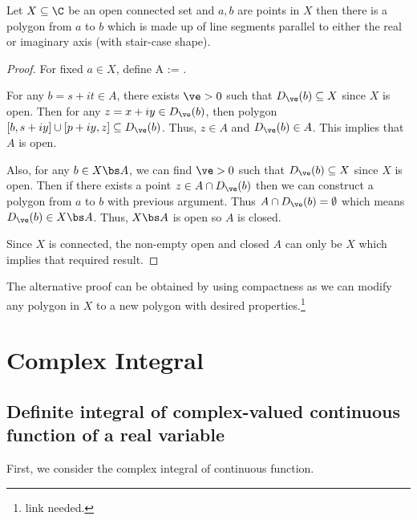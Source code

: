 \begin{corollary}
Let $X\subseteq \C$ be an open connected set and $a,b$ are points in $X$ then there is a polygon from $a$ to $b$ which is made up of line segments parallel to either the real or imaginary axis (with stair-case shape).
\end{corollary}

\begin{proof}
For fixed $a\in X$, define
\be
A := .
\ee

For any $b = s+it \in A$, there exists $\ve>0$ such that $D_\ve(b)\subseteq X$ since $X$ is open. Then for any $z=x+iy \in D_\ve(b)$, then polygon $[b,s+iy]\cup [p+iy,z] \subseteq D_\ve(b)$. Thus, $z\in A$ and $D_{\ve}(b)\in A$. This implies that $A$ is open.

Also, for any $b\in X\bs A$, we can find $\ve>0$ such that $D_\ve(b) \subseteq X$ since $X$ is open. Then if there exists a point $z\in A\cap D_\ve(b)$ then we can construct a polygon from $a$ to $b$ with previous argument. Thus $A\cap D_\ve(b)= \emptyset$ which means $D_\ve(b)\in X\bs A$. Thus, $X\bs A$ is open so $A$ is closed.

Since $X$ is connected, the non-empty open and closed $A$ can only be $X$ which implies that required result.
\end{proof}

\begin{remark}
The alternative proof can be obtained by using compactness as we can modify any polygon in $X$ to a new polygon with desired properties.\footnote{link needed.}
\end{remark}









\section{Complex Integral}

\subsection{Definite integral of complex-valued continuous function of a real variable}


First, we consider the complex integral of continuous function.


